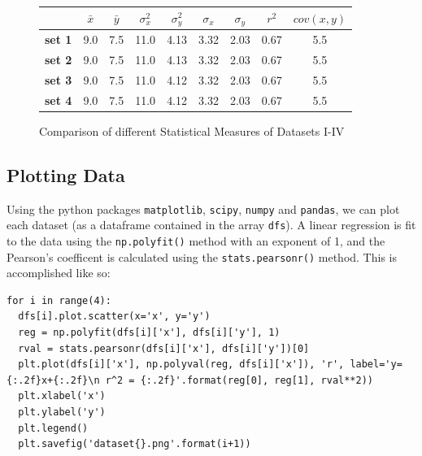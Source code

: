 \documentclass[11pt,a4paper]{article}
\begin{document}
\begin{figure}[]
\centering
\begin{tabular}{l|c|c|c|c|c|c|c|c|}
\cline{2-9}
                                     & \textbf{$\bar{x}$} & \textbf{$\bar{y}$} & \textbf{$\sigma_x^2$} & \textbf{$\sigma_y^2$} & \textbf{$\sigma_x$} & \textbf{$\sigma_y$} & \textbf{$r^2$} & \textbf{$cov(x, y)$} \\ \hline
\multicolumn{1}{|l|}{\textbf{set 1}} & 9.0                & 7.5              & 11.0                & 4.13                & 3.32                  & 2.03                  & 0.67           & 5.5                  \\ \hline
\multicolumn{1}{|l|}{\textbf{set 2}} & 9.0                & 7.5              & 11.0                & 4.13                & 3.32                  & 2.03                  & 0.67           & 5.5                  \\ \hline
\multicolumn{1}{|l|}{\textbf{set 3}} & 9.0                & 7.5              & 11.0                & 4.12                & 3.32                  & 2.03                  & 0.67           & 5.5                  \\ \hline
\multicolumn{1}{|l|}{\textbf{set 4}} & 9.0                & 7.5              & 11.0                & 4.12                & 3.32                  & 2.03                  & 0.67           & 5.5                  \\ \hline
\end{tabular}
\caption{Comparison of different Statistical Measures of Datasets I-IV}
\label{fig:table}
\end{figure}

\subsection{Plotting Data}

Using the python packages \texttt{matplotlib}, \texttt{scipy}, \texttt{numpy} and \texttt{pandas}, we can plot each dataset (as a dataframe contained in the array \texttt{dfs}). A linear regression is fit to the data using the \texttt{np.polyfit()} method with an exponent of 1, and the Pearson's coefficent is calculated using the \texttt{stats.pearsonr()} method. This is accomplished like so:

\begin{lstlisting}
for i in range(4):
  dfs[i].plot.scatter(x='x', y='y') 
  reg = np.polyfit(dfs[i]['x'], dfs[i]['y'], 1)
  rval = stats.pearsonr(dfs[i]['x'], dfs[i]['y'])[0]
  plt.plot(dfs[i]['x'], np.polyval(reg, dfs[i]['x']), 'r', label='y={:.2f}x+{:.2f}\n r^2 = {:.2f}'.format(reg[0], reg[1], rval**2))
  plt.xlabel('x')
  plt.ylabel('y')
  plt.legend()
  plt.savefig('dataset{}.png'.format(i+1))
\end{lstlisting}
\end{document}
